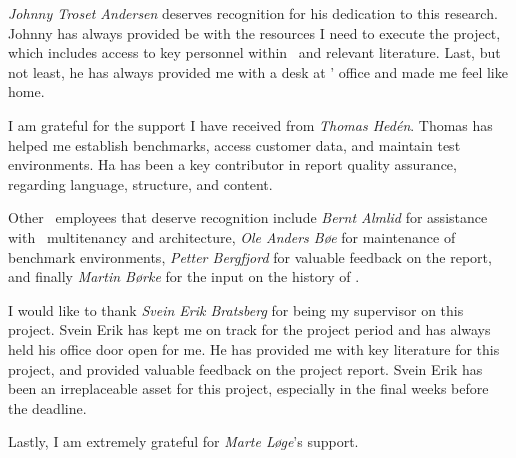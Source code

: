 \textit{Johnny Troset Andersen} deserves recognition for his dedication to this research. Johnny has always provided be with the resources I need to execute the project, which includes access to key personnel within \genus~and relevant literature. Last, but not least, he has always provided me with a desk at \genus' office and made me feel like home.

I am grateful for the support I have received from \textit{Thomas Hedén}. Thomas has helped me establish benchmarks, access customer data, and maintain test environments. Ha has been a key contributor in report quality assurance, regarding language, structure, and content.

Other \genus~employees that deserve recognition include \textit{Bernt Almlid} for assistance with \gap~multitenancy and architecture, \textit{Ole Anders Bøe} for maintenance of benchmark environments, \textit{Petter Bergfjord} for valuable feedback on the report, and finally \textit{Martin Børke} for the input on the history of \bi. 

I would like to thank \textit{Svein Erik Bratsberg} for being my supervisor on this project. Svein Erik has kept me on track for the project period and has always held his office door open for me. He has provided me with key literature for this project, and provided valuable feedback on the project report. Svein Erik has been an irreplaceable asset for this project, especially in the final weeks before the deadline.

Lastly, I am extremely grateful for \textit{Marte Løge}'s support.
